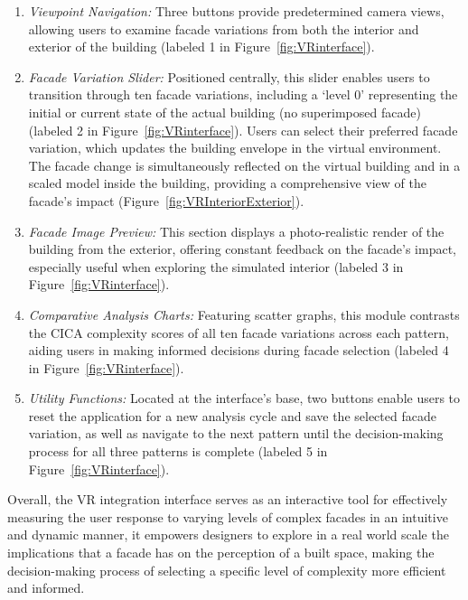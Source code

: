 \begin{enumerate}
\item \textit{Viewpoint Navigation:} Three buttons provide predetermined camera views, allowing users to examine facade variations from both the interior and exterior of the building (labeled 1 in Figure~\ref{fig:VRinterface}).

\item \textit{Facade Variation Slider:} Positioned centrally, this slider enables users to transition through ten facade variations, including a `level 0' representing the initial or current state of the actual building (no superimposed facade) (labeled 2 in Figure~\ref{fig:VRinterface}).
Users can select their preferred facade variation, which updates the building envelope in the virtual environment.
The facade change is simultaneously reflected on the virtual building and in a scaled model inside the building, providing a comprehensive view of the facade's impact (Figure~\ref{fig:VRInteriorExterior}).

\item \textit{Facade Image Preview:} This section displays a photo-realistic render of the building from the exterior, offering constant feedback on the facade's impact, especially useful when exploring the simulated interior (labeled 3 in Figure~\ref{fig:VRinterface}).

\item \textit{Comparative Analysis Charts:} Featuring scatter graphs, this module contrasts the CICA complexity scores of all ten facade variations across each pattern, aiding users in making informed decisions during facade selection (labeled 4 in Figure~\ref{fig:VRinterface}).

\item \textit{Utility Functions:} Located at the interface's base, two buttons enable users to reset the application for a new analysis cycle and save the selected facade variation, as well as navigate to the next pattern until the decision-making process for all three patterns is complete (labeled 5 in Figure~\ref{fig:VRinterface}).
\end{enumerate}

Overall, the VR integration interface serves as an interactive tool for effectively measuring the user response to varying levels of complex facades in an intuitive and dynamic manner, it empowers designers to explore in a real world scale the implications that a facade has on the perception of a built space, making the decision-making process of selecting a specific level of complexity more efficient and informed.






